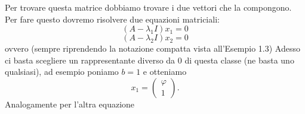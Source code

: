 \documentclass{article}     %
\begin{document}
Per trovare questa matrice dobbiamo trovare i due vettori che la compongono. Per fare questo dovremo risolvere due equazioni matriciali:
\[(A -\lambda_1 I)x_1 = 0\]
\[(A -\lambda_2 I)x_2 = 0\]
ovvero (sempre riprendendo la notazione compatta vista all'Esempio 1.3)
\grid[4.4cm]{}
Adesso ci basta scegliere un rappresentante diverso da 0 di questa classe (ne basta uno qualsiasi), ad esempio poniamo $b=1$ e otteniamo
\[x_1 =\begin{pmatrix} \varphi\\1 \end{pmatrix} .\]
Analogamente per l'altra equazione
\end{document}
